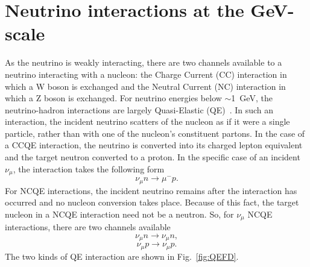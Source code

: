 \section{Neutrino interactions at the GeV-scale}
\label{sec:NeutrinoInteractionsGeVScale}
As the neutrino is weakly interacting, there are two channels available to a neutrino interacting with a nucleon: the Charge Current (CC) interaction in which a W boson is exchanged and the Neutral Current (NC) interaction in which a Z boson is exchanged.  For neutrino energies below $\sim$1~GeV, the neutrino-hadron interactions are largely Quasi-Elastic (QE)~\cite{RevModPhys.84.1307}.  In such an interaction, the incident neutrino scatters of the nucleon as if it were a single particle, rather than with one of the nucleon's constituent partons.  In the case of a CCQE interaction, the neutrino is converted into its charged lepton equivalent and the target neutron converted to a proton.  In the specific case of an incident $\nu_\mu$, the interaction takes the following form
\begin{equation}
\nu_\mu n \rightarrow \mu^- p.
\label{eq:CCQEInteraction}
\end{equation}
For NCQE interactions, the incident neutrino remains after the interaction has occurred and no nucleon conversion takes place.  Because of this fact, the target nucleon in a NCQE interaction need not be a neutron.  So, for $\nu_\mu$ NCQE interactions, there are two channels available
\begin{equation}
\nu_\mu n \rightarrow \nu_\mu n,
\label{eq:NCQEInteractionNeutronTarget}
\end{equation}
\begin{equation}
\nu_\mu p \rightarrow \nu_\mu p.
\label{eq:NCQEInteractionProtonTarget}
\end{equation}
The two kinds of QE interaction are shown in Fig.~\ref{fig:QEFD}.
